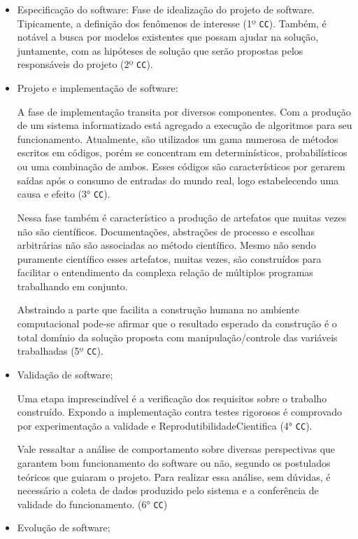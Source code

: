 \begin{itemize}
    \item Especificação do software: Fase de idealização do projeto de software. Tipicamente, a definição dos fenômenos de interesse (1º \texttt{CC}).
    Também, é notável a busca por modelos existentes que possam ajudar na solução, juntamente, com as hipóteses de solução que serão propostas pelos responsáveis do projeto (2º \texttt{CC}).
    \item Projeto e implementação de software:
    
    A fase de implementação transita por diversos componentes. Com a produção de um sistema informatizado está agregado a execução de algoritmos para seu funcionamento. Atualmente, são utilizados um gama numerosa de métodos escritos em códigos, porém se concentram em determinísticos, probabilísticos ou uma combinação de ambos. Esses códigos são característicos por gerarem saídas após o consumo de entradas do mundo real, logo estabelecendo uma causa e efeito (3° \texttt{CC}). 
    
    Nessa fase também é característico a produção de artefatos que muitas vezes não são científicos. Documentações, abstrações de processo e escolhas arbitrárias não são associadas ao método científico. Mesmo não sendo puramente científico esses artefatos, muitas vezes, são construídos para facilitar o entendimento da complexa relação de múltiplos programas trabalhando em conjunto.
    
    Abstraindo a parte que facilita a construção humana no ambiente computacional pode-se afirmar que o resultado esperado da construção é o total domínio da solução proposta com manipulação/controle das variáveis trabalhadas (5º \texttt{CC}). 
    
    \item Validação de software;
    
    Uma etapa imprescindível é a verificação dos requisitos sobre o trabalho construído. Expondo a implementação contra testes rigorosos é comprovado por experimentação a validade e \gls{ReprodutibilidadeCientifica} (4° \texttt{CC}).
    
    Vale ressaltar a análise de comportamento sobre diversas perspectivas que garantem bom funcionamento do software ou não, segundo os postulados teóricos que guiaram o projeto. Para realizar essa análise, sem dúvidas, é necessário a coleta de dados produzido pelo sistema e a conferência de validade do funcionamento. (6° \texttt{CC}) 
    
    \item Evolução de software;
    

\end{itemize}
